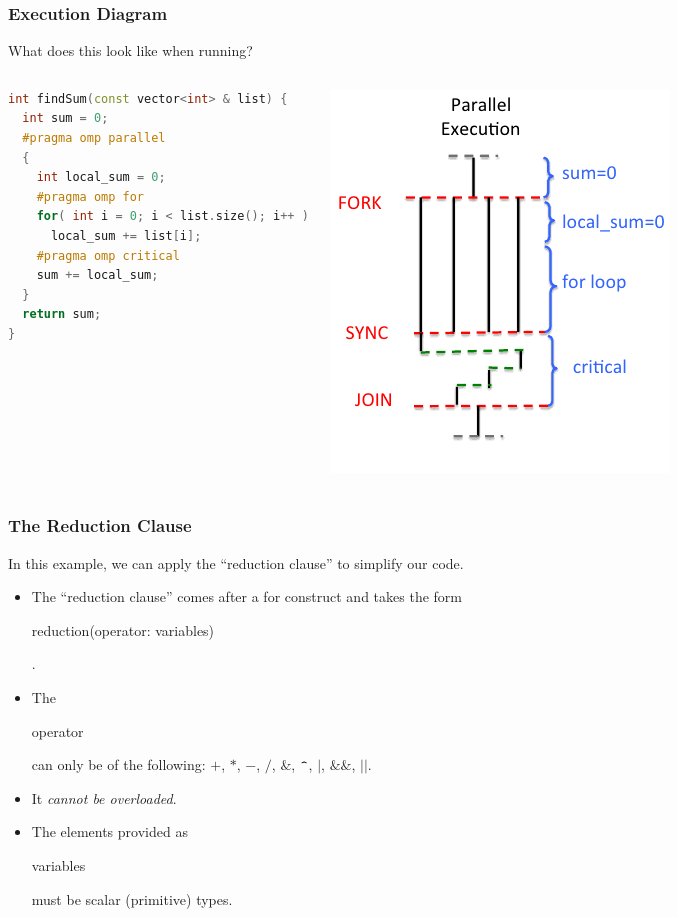\documentclass[table]{beamer}
\newcommand{\ttt}[1]{\begin{tt}#1\end{tt}}
\begin{document}
\begin{frame}[fragile]
    \frametitle{Execution Diagram}
    What does this look like when running?
    \begin{columns}[c]
        \column{2.6in}
\begin{lstlisting}[language=C++,basicstyle=\tiny]
int findSum(const vector<int> & list) {
  int sum = 0;
  #pragma omp parallel
  {
    int local_sum = 0;
    #pragma omp for
    for( int i = 0; i < list.size(); i++ )
      local_sum += list[i];
    #pragma omp critical
    sum += local_sum;
  }
  return sum;
}
\end{lstlisting}

        \column{1.8in}
        \includegraphics[scale=.4]{execution_diagram.png}
    \end{columns}
\end{frame}

\begin{frame}[fragile]
    \frametitle{The Reduction Clause}
    In this example, we can apply the ``reduction clause'' to simplify our 
    code.
    \begin{itemize}
        \item<2-> The ``reduction clause'' comes after a for construct and 
        takes the form \ttt{reduction(operator: variables)}.
        \item<3-> The \ttt{operator} can only be of the following: $+$, 
        $*$, $-$, $/$, $\&$, $\verb|^|$, $|$, $\&\&$, $||$.
        \item<4-> It \emph{cannot be overloaded}.
        \item<5-> The elements provided as \ttt{variables} must be scalar (primitive) types.
    \end{itemize}
\end{frame}
\end{document}
